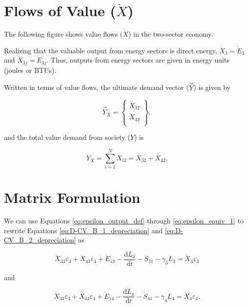 \section{Flows of Value ($\dot{X}$)}

The following figure shows value flows ($\dot{X}$) in the two-sector economy.

Realizing that the valuable output from energy sectors is direct energy, $\dot{X}_{3} = \dot{E}_{3}$ and $\dot{X}_{3j} = \dot{E}_{3j}$. Thus, outputs from energy sectors are given in energy units (joules or BTUs). 

Written in terms of value flows, the ultimate demand vector ($\vec{Y}$) is given by

\begin{equation} \label{eq:D-demand_vector_B_dot}
	\vec{Y}_{\dot{X}} = 	\begin{Bmatrix} 	\dot{X}_{32}	\\
																\dot{X}_{42}	\\
									\end{Bmatrix},
\end{equation}

\noindent and the total value demand from society ($Y$) is 

\begin{equation} \label{eq:D-total_value_demand}
	Y_{\dot{X}} = \sum_{i=1}^{N} \dot{X}_{i2} = \dot{X}_{32} + \dot{X}_{42}.
	\end{equation}

\section{Matrix Formulation}

We can use Equations \ref{eq:epsilon_output_def} through \ref{eq:epsilon_equiv_1} to rewrite Equations \ref{eq:D-CV_B_1_depreciation} and \ref{eq:D-CV_B_2_depreciation} as

\begin{equation} \label{eq:D-CV_B_3_with_eps}
	\dot{X}_{33}\varepsilon_{3} + \dot{X}_{43}\varepsilon_{4} + \dot{E}_{13} - \frac{\mathrm{d}L_{3}}{\mathrm{d}t} - \dot{S}_{31} - \gamma_{3}L_{3} = \dot{X}_{3}\varepsilon_{3}
\end{equation}

\noindent and 

\begin{equation} \label{eq:D-CV_B_4_with_eps}
	\dot{X}_{34}\varepsilon_{3} + \dot{X}_{44}\varepsilon_{4} + \dot{E}_{14} - \frac{\mathrm{d}L_{4}}{\mathrm{d}t} - \dot{S}_{41} - \gamma_{4}L_{4} = \dot{X}_{4}\varepsilon_{4}.
\end{equation}

